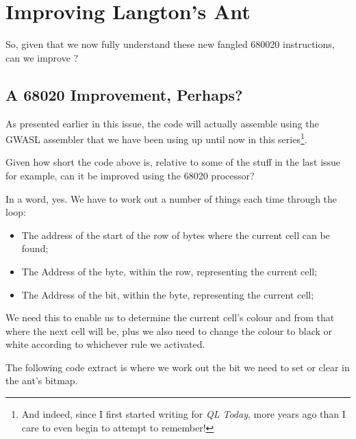\chapter{Improving Langton's Ant}

So, given that we now fully understand these new fangled 680020 instructions, can we improve ?


\section{A 68020 Improvement, Perhaps?}

As presented earlier in this issue, the code will actually assemble using the GWASL assembler that we have been using up until now in this series\footnote{And indeed, since I first started writing for \emph{QL Today}, more years ago than I care to even begin to attempt to remember!}.

Given how short the code above is, relative to some of the stuff in the last issue for example, can it be improved using the 68020 processor?

In a word, yes. We have to work out a number of things each time through the loop:

\begin{itemize}
	\item The address of the start of the row of bytes where the current cell can be found;
	\item The Address of the byte, within the row, representing the current cell;
	\item The Address of the bit, within the byte, representing the current cell;
\end{itemize}

We need this to enable us to determine the current cell's colour and from that where the next cell will be, plus we also need to change the colour to black or white according to whichever rule we activated.

The following code extract is where we work out the bit we need to set or clear in the ant's bitmap.


